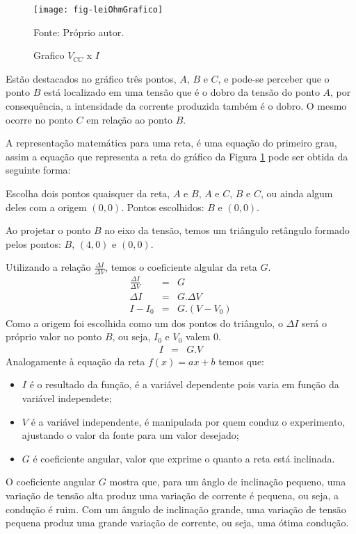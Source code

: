 \begin{figure}[H]
  \centering
  \caption{Grafico $V_{CC}$ x $I$}
  \label{fig:leiOhmGrafico}
  \texttt{[image: fig-leiOhmGrafico]}

  {\small Fonte: Próprio autor.}
\end{figure}

Estão destacados no gráfico três pontos, $A$, $B$ e $C$, e pode-se perceber que o ponto $B$ está localizado em uma tensão que é o dobro da tensão do ponto $A$, por consequência, a intensidade da corrente produzida também é o dobro. O mesmo ocorre no ponto $C$ em relação ao ponto $B$.

A representação matemática para uma reta, é uma equação do primeiro grau, assim a equação que representa a reta do gráfico da Figura \ref{fig:leiOhmGrafico} pode ser obtida da seguinte forma:

Escolha dois pontos quaisquer da reta, $A$ e $B$, $A$ e $C$, $B$ e $C$, ou ainda algum deles com a origem $(0,0)$.
Pontos escolhidos: $B$ e $(0,0)$.

Ao projetar o ponto $B$ no eixo da tensão, temos um triângulo retângulo formado pelos pontos: $B$, $(4,0)$ e $(0,0)$.

Utilizando a relação $\frac{\Delta I}{\Delta V}$, temos o coeficiente algular da reta $G$.
\vspace{-3mm}
\begin{eqnarray}
  \frac{\Delta I}{\Delta V} & = & G \nonumber \\
  \Delta I & = & G .\Delta V \nonumber \\
  I - I_0 & = & G . (V - V_0)
\end{eqnarray}
Como a origem foi escolhida como um dos pontos do triângulo, o $\Delta I$ será o próprio valor no ponto $B$, ou seja, $I_0$ e $V_0$ valem $0$.
\vspace{-3mm}
\begin{eqnarray}
  \label{eqn:leiOhmG}
  I & = & G . V
\end{eqnarray}
Analogamente à equação da reta $f(x) = ax + b$ temos que:
\begin{itemize}
\vspace{-3mm}
  \item $I$ é o resultado da função, é a variável dependente pois varia em função da variável independete;
  \item $V$ é a variável independente, é manipulada por quem conduz o experimento, ajustando o valor da fonte para um valor desejado;
  \item $G$ é coeficiente angular, valor que exprime o quanto a reta está inclinada.
\end{itemize}
\vspace{-3mm}
O coeficiente angular $G$ mostra que, para um ânglo de inclinação pequeno, uma variação de tensão alta produz uma variação de corrente é pequena, ou seja, a condução é ruim. Com um ângulo de inclinação grande, uma variação de tensão pequena produz uma grande variação de corrente, ou seja, uma ótima condução.

